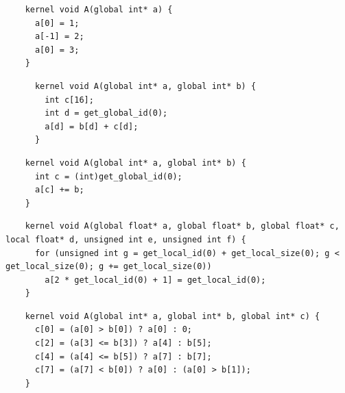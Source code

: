 \newsavebox{\XeonPhiInvalidWrite}
\begin{lrbox}{\XeonPhiInvalidWrite}
  \hspace{1.5em}
  \begin{lstlisting}
    kernel void A(global int* a) {
      a[0] = 1;
      a[-1] = 2;
      a[0] = 3;
    }
  \end{lstlisting}
\end{lrbox}

\newsavebox{\UninitRead}
\begin{lrbox}{\UninitRead}
  \hspace{1.5em}
  \begin{lstlisting}
      kernel void A(global int* a, global int* b) {
        int c[16];
        int d = get_global_id(0);
        a[d] = b[d] + c[d];
      }
  \end{lstlisting}
\end{lrbox}

\newsavebox{\IntelPtrAssertion}
\begin{lrbox}{\IntelPtrAssertion}
  \hspace{1.5em}
  \begin{lstlisting}
    kernel void A(global int* a, global int* b) {
      int c = (int)get_global_id(0);
      a[c] += b;
    }
  \end{lstlisting}
\end{lrbox}

\newsavebox{\IntelScalarAssertion}
\begin{lrbox}{\IntelScalarAssertion}
  \hspace{1.5em}
  \begin{lstlisting}
    kernel void A(global float* a, global float* b, global float* c, local float* d, unsigned int e, unsigned int f) {
      for (unsigned int g = get_local_id(0) + get_local_size(0); g < get_local_size(0); g += get_local_size(0))
        a[2 * get_local_id(0) + 1] = get_local_id(0);
    }
  \end{lstlisting}
\end{lrbox}

\newsavebox{\BeignetTernary}
\begin{lrbox}{\BeignetTernary}
  \hspace{1.5em}
  \begin{lstlisting}
    kernel void A(global int* a, global int* b, global int* c) {
      c[0] = (a[0] > b[0]) ? a[0] : 0;
      c[2] = (a[3] <= b[3]) ? a[4] : b[5];
      c[4] = (a[4] <= b[5]) ? a[7] : b[7];
      c[7] = (a[7] < b[0]) ? a[0] : (a[0] > b[1]);
    }
  \end{lstlisting}
\end{lrbox}
%


